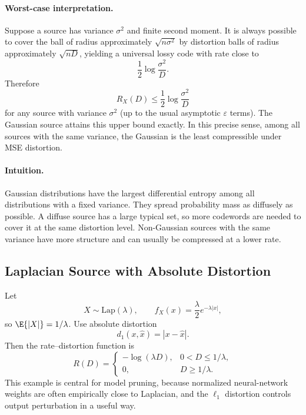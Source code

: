 \paragraph{Worst-case interpretation.}
Suppose a source has variance $\sigma^2$ and finite second moment.
It is always possible to cover the ball of radius approximately $\sqrt{n\sigma^2}$ by distortion balls of radius approximately $\sqrt{nD}$, yielding a universal lossy code with rate close to
\[
    \frac12\log\frac{\sigma^2}{D}.
\]
Therefore
\begin{equation}
    R_X(D)\le \frac12\log\frac{\sigma^2}{D}
\end{equation}
for any source with variance $\sigma^2$ (up to the usual asymptotic $\varepsilon$ terms).
The Gaussian source attains this upper bound exactly.
In this precise sense, among all sources with the same variance, the Gaussian is the least compressible under MSE distortion.

\paragraph{Intuition.}
Gaussian distributions have the largest differential entropy among all distributions with a fixed variance.
They spread probability mass as diffusely as possible.
A diffuse source has a large typical set, so more codewords are needed to cover it at the same distortion level.
Non-Gaussian sources with the same variance have more structure and can usually be compressed at a lower rate.

\subsection{Laplacian Source with Absolute Distortion}
\label{subsec:laplace-l1-rd}

Let
\[
    X\sim\mathrm{Lap}(\lambda),
    \qquad
    f_X(x)=\frac{\lambda}{2}e^{-\lambda |x|},
\]
so $\E{|X|}=1/\lambda$.
Use absolute distortion
\[
    d_1(x,\hat x)=|x-\hat x|.
\]
Then the rate--distortion function is
\begin{equation}
R(D)=
\begin{cases}
-
\log(\lambda D), & 0<D\le 1/\lambda,\\[1mm]
0, & D\ge 1/\lambda.
\end{cases}
\label{eq:laplace-l1-rd}
\end{equation}
This example is central for model pruning, because normalized neural-network weights are often empirically close to Laplacian, and the $\ell_1$ distortion controls output perturbation in a useful way.

